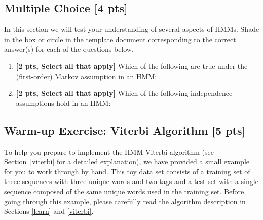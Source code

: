 \documentclass{article}
\begin{document}
\subsection{Multiple Choice [4 pts]}
In this section we will test your understanding of several aspects of HMMs.
%
Shade in the box or circle in the template document corresponding to the correct answer(s) for each of the questions below. 


\begin{enumerate}
\item \textbf{[2 pts, Select all that apply]} Which of the following are true under the (first-order) Markov assumption in an HMM: 


\item \textbf{[2 pts, Select all that apply]} Which of the following independence assumptions hold in an HMM:

\end{enumerate}


\subsection{Warm-up Exercise: Viterbi Algorithm [5 pts]}\label{toy}
To help you prepare to implement the HMM Viterbi algorithm (see Section~\ref{viterbi} for a detailed explanation), we have provided a small example for you to work through by hand. This toy data set consists of a training set of three sequences with three unique words and two tags and a test set with a single sequence composed of the same unique words used in the training set. Before going through this example, please carefully read the algorithm description in Sections \ref{learn} and \ref{viterbi}.
\end{document}
